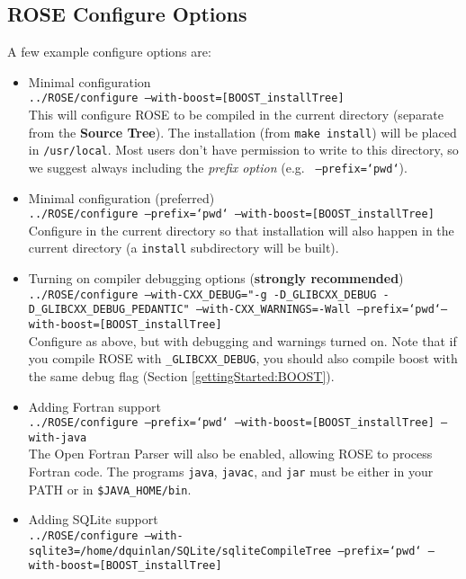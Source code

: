 \subsection{ROSE Configure Options}
\label{gettingStarted:configureOptions}
     A few example configure options are:
\begin{itemize}
   \item Minimal configuration \\
         {\tt ../ROSE/configure --with-boost=[BOOST\_installTree]} \\
         This will configure ROSE to be compiled in the current directory (separate from
         the {\bf Source Tree}).  The installation (from {\tt make install}) will be placed in
         {\tt /usr/local}.  Most users don't have permission to write to this directory,
         so we suggest always including the {\em prefix option} (e.g. {\tt
         --prefix=`pwd`}).
   \item Minimal configuration (preferred) \\
         {\tt ../ROSE/configure --prefix=`pwd` --with-boost=[BOOST\_installTree]} \\
         Configure in the current directory so that installation will also happen in the
         current  directory (a {\tt install} subdirectory will be built).
   \item Turning on compiler debugging options (\textbf{strongly recommended}) \\
         {\tt ../ROSE/configure --with-CXX\_DEBUG="-g  -D\_GLIBCXX\_DEBUG -D\_GLIBCXX\_DEBUG\_PEDANTIC" --with-CXX\_WARNINGS=-Wall --prefix=`pwd`--with-boost=[BOOST\_installTree]} \\
         Configure as above, but with debugging and warnings turned on.
          Note that if you compile ROSE with \verb!_GLIBCXX_DEBUG!, you should also compile
         boost with the same debug flag (Section \ref{gettingStarted:BOOST}). 
   \item Adding Fortran support \\
         {\tt ../ROSE/configure --prefix=`pwd` --with-boost=[BOOST\_installTree] --with-java} \\
         The Open Fortran Parser will also be enabled, allowing ROSE to process Fortran
         code.  The programs {\tt java}, {\tt javac}, and {\tt jar} must be either in your 
         PATH or in {\tt \$JAVA\_HOME/bin}.
   \item Adding SQLite support \\
         {\tt ../ROSE/configure --with-sqlite3=/home/dquinlan/SQLite/sqliteCompileTree --prefix=`pwd` --with-boost=[BOOST\_installTree]} \\

\end{itemize}

